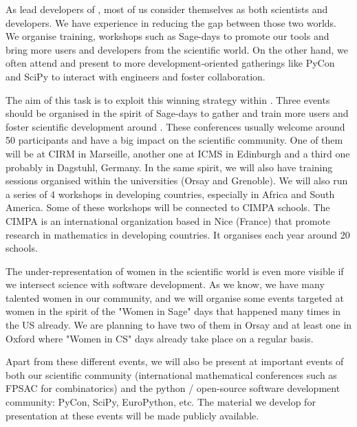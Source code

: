 \begin{workpackage}
\begin{tasklist}
\begin{task}[title=Dissemination: reaching towards users and fostering diversity, lead=PS,PM=12, partners={UB,USH,SA}, id=dissemination, wphases=0-48]

  As lead developers of \TheProject, most of us consider themselves as
  both scientists and developers. We have experience in reducing the
  gap between those two worlds. We organise training, workshops such
  as Sage-days to promote our tools and bring more users and
  developers from the scientific world. On the other hand, we often
  attend and present to more development-oriented gatherings like
  PyCon and SciPy to interact with engineers and foster
  collaboration.

  The aim of this task is to exploit this winning strategy within
  \TheProject. Three events should be organised in the spirit of
  Sage-days to gather and train more users and foster scientific
  development around \TheProject. These conferences usually welcome
  around 50 participants and have a big impact on the scientific
  community. One of them will be at CIRM in Marseille, another one at
  ICMS in Edinburgh and a third one probably in Dagstuhl, Germany. In
  the same spirit, we will also have training sessions organised
  within the universities (Orsay and Grenoble). We will also run a
  series of 4 workshops in developing countries, especially in Africa and
  South America. Some of these workshops will be connected to CIMPA
  schools.  The CIMPA is an international organization based in Nice
  (France) that promote research in mathematics in developing
  countries. It organises each year around 20 schools.

  The under-representation of women in the scientific world is even
  more visible if we intersect science with software
  development. As we know, we have many talented women in our
  community, and we will organise some events targeted at women in the
  spirit of the "Women in Sage" days that happened many times in the
  US already. We are planning to have two of them in Orsay and at least
  one in Oxford where "Women in CS" days already take place on a regular basis.

  Apart from these different events, we will also be present at
  important events of both our scientific community (international
  mathematical conferences such as FPSAC for combinatorics) and the
  python / open-source software development community: PyCon, SciPy,
  EuroPython, etc. The material we develop for presentation at these
  events will be made publicly available.
\end{task}



\end{tasklist}
\end{workpackage}
